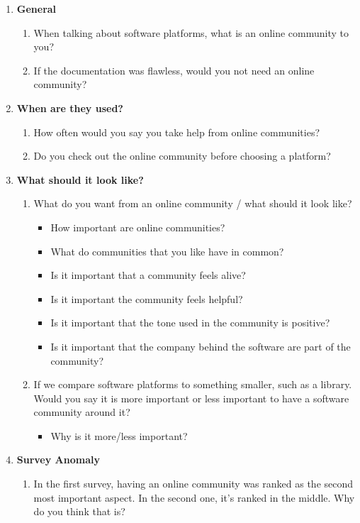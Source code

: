 \documentclass{article}
\begin{document}
\begin{enumerate}[label=C\Alph*]
\item \textbf{General}
\begin{enumerate}[label={CA\arabic*}]
\item	When talking about software platforms, what is an online community to you?
\item	If the documentation was flawless, would you not need an online community?
\end{enumerate}
\item \textbf{When are they used?}
\begin{enumerate}[label={CB\arabic*}]
\item	How often would you say you take help from online communities?
\item   Do you check out the online community before choosing a platform?
\end{enumerate}
\item \textbf{What should it look like?}

\begin{enumerate}[label=CC\arabic*]
\item	What do you want from an online community / what should it look like?
\begin{itemize}[label={-}]
\item How important are online communities?
\item What do communities that you like have in common?
\item Is it important that a community feels alive?
\item Is it important the community feels helpful?
\item Is it important that the tone used in the community is positive?
\item Is it important that the company behind the software are part of the community?
\end{itemize}
\item	If we compare software platforms to something smaller, such as a library. Would you say it is more important or less important to have a software community around it?
\begin{itemize}[label={-}]
\item Why is it more/less important?
\end{itemize}
\end{enumerate}
\item \textbf{Survey Anomaly}
\begin{enumerate}[label={CD\arabic*}]
\item In the first survey, having an online community was ranked as the second most important aspect. In the second one, it’s ranked in the middle. Why do you think that is?
\end{enumerate}
\end{enumerate}
\end{document}
